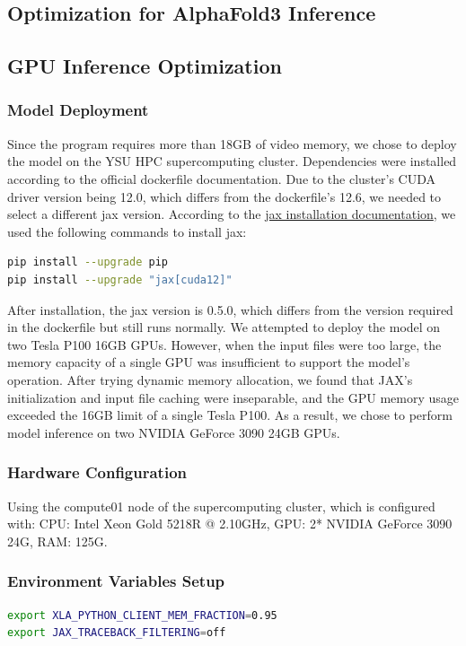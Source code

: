 \documentclass[a4paper,12pt]{article}
\begin{document}
\subsection{Optimization for AlphaFold3 Inference}

\subsection{GPU Inference Optimization}

\subsubsection{Model Deployment}
Since the program requires more than 18GB of video memory, we chose to deploy the model on the YSU HPC supercomputing cluster. Dependencies were installed according to the official dockerfile documentation. Due to the cluster's CUDA driver version being 12.0, which differs from the dockerfile's 12.6, we needed to select a different jax version. According to the \href{https://docs.jax.dev/en/latest/installation.html#nvidia-gpu}{jax installation documentation}, we used the following commands to install jax:

\begin{lstlisting}[language=bash]
pip install --upgrade pip
pip install --upgrade "jax[cuda12]"
\end{lstlisting}

After installation, the jax version is 0.5.0, which differs from the version required in the dockerfile but still runs normally.
We attempted to deploy the model on two Tesla P100 16GB GPUs. However, when the input files were too large, the memory capacity of a single GPU was insufficient to support the model's operation. After trying dynamic memory allocation, we found that JAX's initialization and input file caching were inseparable, and the GPU memory usage exceeded the 16GB limit of a single Tesla P100. As a result, we chose to perform model inference on two NVIDIA GeForce 3090 24GB GPUs.
\subsubsection{Hardware Configuration}
Using the compute01 node of the supercomputing cluster, which is configured with: CPU: Intel Xeon Gold 5218R @ 2.10GHz, GPU: 2* NVIDIA GeForce 3090 24G, RAM: 125G.

\subsubsection{Environment Variables Setup}
\begin{lstlisting}[language=bash]
export XLA_PYTHON_CLIENT_MEM_FRACTION=0.95
export JAX_TRACEBACK_FILTERING=off
\end{lstlisting}
\end{document}

